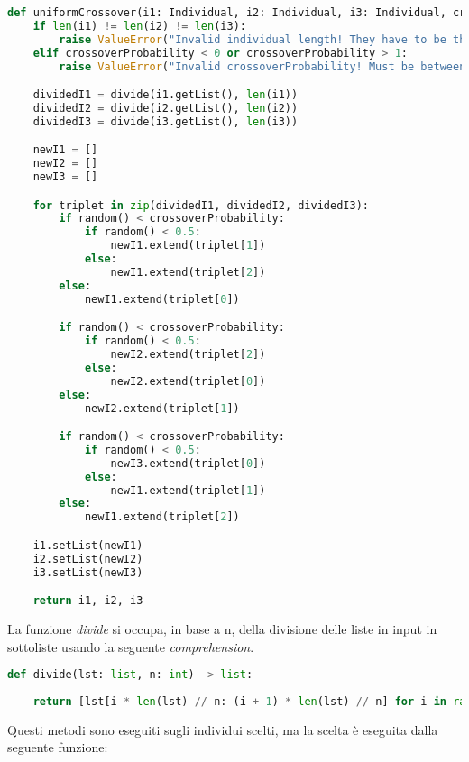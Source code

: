 \documentclass{article}
\begin{document}
\begin{lstlisting}[language=Python]
def uniformCrossover(i1: Individual, i2: Individual, i3: Individual, crossoverProbability: float) -> tuple[Individual, Individual, Individual]:
    if len(i1) != len(i2) != len(i3):
        raise ValueError("Invalid individual length! They have to be the same.")
    elif crossoverProbability < 0 or crossoverProbability > 1:
        raise ValueError("Invalid crossoverProbability! Must be between 0 and 1.")

    dividedI1 = divide(i1.getList(), len(i1))
    dividedI2 = divide(i2.getList(), len(i2))
    dividedI3 = divide(i3.getList(), len(i3))

    newI1 = []
    newI2 = []
    newI3 = []

    for triplet in zip(dividedI1, dividedI2, dividedI3):
        if random() < crossoverProbability:
            if random() < 0.5:
                newI1.extend(triplet[1])
            else:
                newI1.extend(triplet[2])
        else:
            newI1.extend(triplet[0])

        if random() < crossoverProbability:
            if random() < 0.5:
                newI2.extend(triplet[2])
            else:
                newI2.extend(triplet[0])
        else:
            newI2.extend(triplet[1])

        if random() < crossoverProbability:
            if random() < 0.5:
                newI3.extend(triplet[0])
            else:
                newI1.extend(triplet[1])
        else:
            newI1.extend(triplet[2])

    i1.setList(newI1)
    i2.setList(newI2)
    i3.setList(newI3)

    return i1, i2, i3
        \end{lstlisting}


La funzione \textit{divide} si occupa, in base a n, della divisione delle liste in input in sottoliste usando la seguente \textit{comprehension}.
   
    

     \begin{lstlisting}[language=Python]
def divide(lst: list, n: int) -> list:
   
    return [lst[i * len(lst) // n: (i + 1) * len(lst) // n] for i in range(n)]
        \end{lstlisting}


\pagebreak




Questi metodi sono eseguiti sugli individui scelti, ma la scelta è eseguita dalla seguente funzione:
\end{document}
